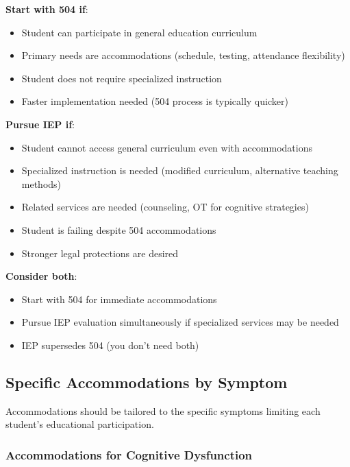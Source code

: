 \begin{protocol*}

\textbf{Start with 504 if}:
\begin{itemize}
    \item Student can participate in general education curriculum
    \item Primary needs are accommodations (schedule, testing, attendance flexibility)
    \item Student does not require specialized instruction
    \item Faster implementation needed (504 process is typically quicker)
\end{itemize}

\textbf{Pursue IEP if}:
\begin{itemize}
    \item Student cannot access general curriculum even with accommodations
    \item Specialized instruction is needed (modified curriculum, alternative teaching methods)
    \item Related services are needed (counseling, OT for cognitive strategies)
    \item Student is failing despite 504 accommodations
    \item Stronger legal protections are desired
\end{itemize}

\textbf{Consider both}:
\begin{itemize}
    \item Start with 504 for immediate accommodations
    \item Pursue IEP evaluation simultaneously if specialized services may be needed
    \item IEP supersedes 504 (you don't need both)
\end{itemize}
\end{protocol*}

\subsection{Specific Accommodations by Symptom}
\label{subsec:accommodations-by-symptom}

Accommodations should be tailored to the specific symptoms limiting each student's educational participation.

\subsubsection{Accommodations for Cognitive Dysfunction}


